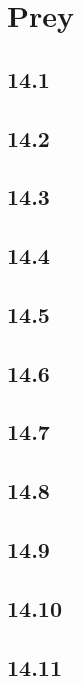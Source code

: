 \part{Prey}

 \chapter{14.1}

 \chapter{14.2}

 \chapter{14.3}

 \chapter{14.4}

 \chapter{14.5}

 \chapter{14.6}

 \chapter{14.7}

 \chapter{14.8}

 \chapter{14.9}

 \chapter{14.10}

 \chapter{14.11}

